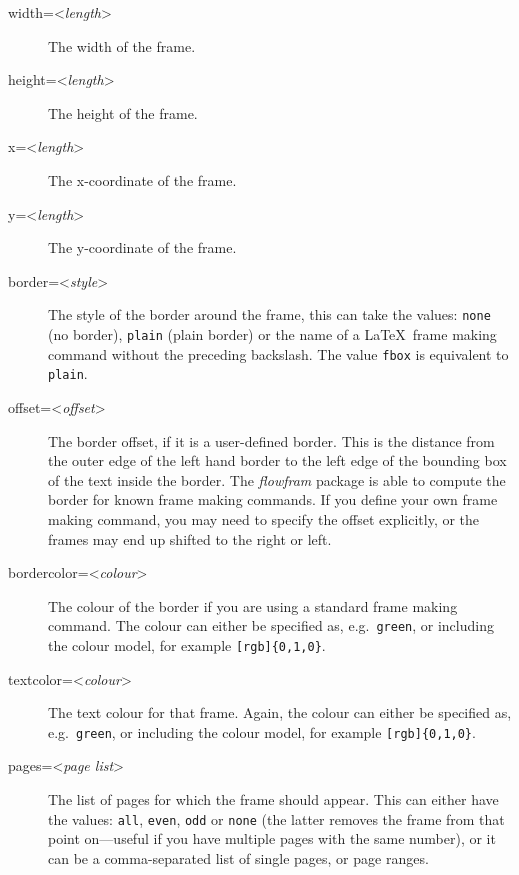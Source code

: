 \documentclass[a4paper]{report}
\newcommand{\meta}[1]{\textnormal{\textless\textit{#1}\textgreater}}
\begin{document}
\begin{description}
\item[width=\meta{length}]\mbox{}\par  The width of the frame.

\item[height=\meta{length}]\mbox{}\par The height of the frame.

\item[x=\meta{length}]\mbox{}\par The x-coordinate of the frame.

\item[y=\meta{length}]\mbox{}\par The y-coordinate of the frame.

\item[border=\meta{style}]\mbox{}\par The style of the border around the
frame, this can take the values: \texttt{none} (no border),
\texttt{plain} (plain border) or the name of a \LaTeX\
frame making command without the preceding backslash.
The value \texttt{fbox} is equivalent to \texttt{plain}.

\item[offset=\meta{offset}]\mbox{}\par The border offset, if it is a
user-defined border.  This is the distance from the outer
edge of the left hand border to the left edge of the
bounding box of the text inside the border.  The \textsl{flowfram}
package is able to compute the border for
known frame making commands.
If you define your own frame making command, you may need to
specify the offset explicitly, or the frames
may end up shifted to the right or left.

\item[bordercolor=\meta{colour}]\mbox{}\par The colour of the border
if you are using a standard frame making command.
The colour can either be specified as, e.g.\ \texttt{green},
or including the colour model, for example
\verb/[rgb]{0,1,0}/.

\item[textcolor=\meta{colour}]\mbox{}\par The text colour for that
frame. Again, the colour can either be specified as,
e.g.\ \texttt{green}, or including the colour model,
for example \verb/[rgb]{0,1,0}/.

\item[pages=\meta{page list}]\mbox{}\par The {list of
pages} for which the frame
should appear. This can either have the values: \texttt{all},
\texttt{even}, \texttt{odd} or \texttt{none} (the latter
removes the frame from that point on---useful if you
have multiple pages with the same number), or it can be a
comma-separated list of single pages, or
{page ranges}.


\end{description}
\end{document}
